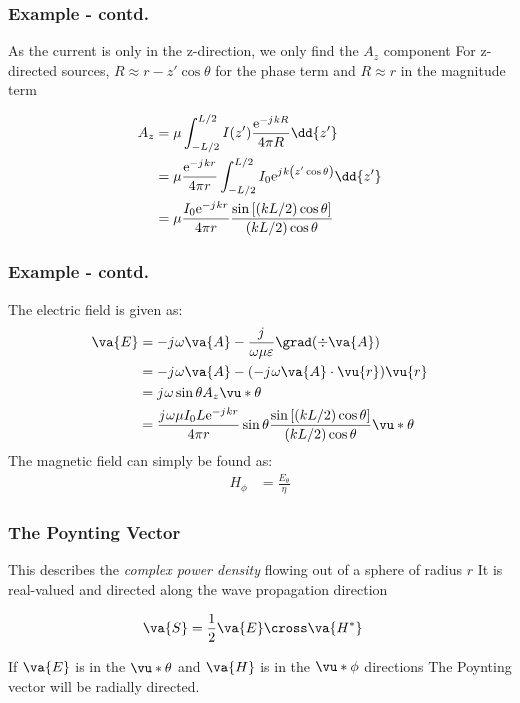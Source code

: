 \documentclass[10pt, compress]{beamer}
\renewcommand{\O}{\omega}  %
\newcommand{\E}{\varepsilon}  %
\renewcommand{\u}{\mu}  %
\newcommand{\e}{\mathrm{e}} %
\renewcommand{\j}{{j}\mkern1mu} %
\begin{document}
\begin{frame}
  \frametitle{Example - contd.}
  \begin{outline}
    \1 As the current is only in the z-direction, we only find the $A_z$ component
    \1 For z-directed sources, $R \approx r - z' \cos \theta$ for the phase term and $R \approx r$ in the magnitude term
  \end{outline}
  \begin{align*}
    A_z & = \u \int_{-L/2}^{L/2} I(z') \frac{\e^{-\j k R}}{4 \pi R} \dd{z'}                                     \\
        & = \u \frac{\e^{-\j k r}}{4 \pi r} \int_{-L/2}^{L/2} I_0 \e^{\j k \left(z' \cos \theta\right)} \dd{z'} \\
        & = \u \frac{I_0 \e^{-\j k r}}{4 \pi r} \frac{\sin \left[(kL/2)\cos \theta\right]}{(kL/2)\cos \theta}
  \end{align*}
\end{frame}

\begin{frame}
  \frametitle{Example - contd.}
  The electric field is given as:
  \begin{align*}
    \va{E} & = - \j \O \va{A} - \frac{\j}{\O \u \E} \grad(\div \va{A})                                                                                      \\
           & = - \j \O \va{A} - (- \j \O \va{A} \cdot \vu{r})\vu{r}                                                                                         \\
           & = \j \O \sin \theta A_z \vu*{\theta}                                                                                                           \\
           & = \frac{\j \O \u I_{0} L \e^{-\j k r}}{4 \pi r} \sin \theta \frac{\sin \left[(k L / 2) \cos \theta\right]}{(k L / 2) \cos \theta} \vu*{\theta}
  \end{align*}
  The magnetic field can simply be found as:
  \begin{align*}
    H_{\phi} & = \frac{E_{\theta}}{\eta}
  \end{align*}
\end{frame}

\begin{frame}
  \frametitle{The Poynting Vector}
  \begin{outline}
    \1 This describes the \textit{complex power density} flowing out of a sphere of radius $r$
    \1 It is real-valued and directed along the wave propagation direction
  \end{outline}
  \begin{align*}
    \va{S} & = \frac{1}{2} \va{E} \cross \va{H^{*}}
  \end{align*}
  \begin{outline}
    \1 If $\va{E}$ is in the $\vu*{\theta}$ and $\va{H}$ is in the $\vu*{\phi}$ directions
    \1 The Poynting vector will be radially directed.
  \end{outline}
\end{frame}
\end{document}
